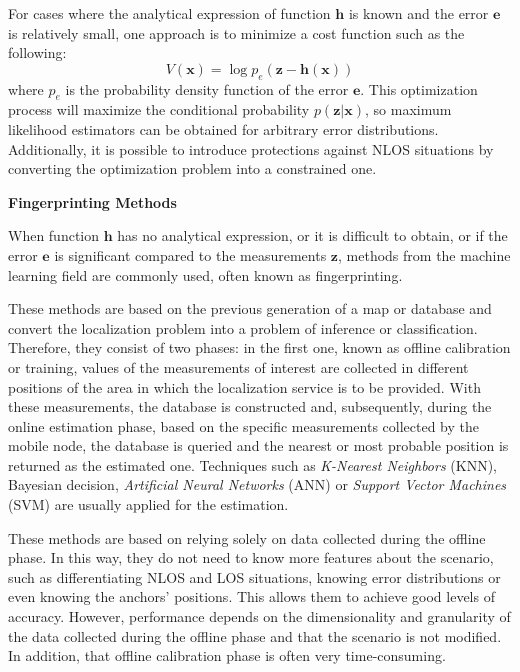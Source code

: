 \begin{description}
	For cases where the analytical expression of function $\boldsymbol{h}$ is known and the error $\boldsymbol{e}$ is relatively small, one approach is to minimize a cost function such as the following:
	\begin{equation}
	\label{eqn_costFunction}
		V(\boldsymbol{x})=\log p_e(\boldsymbol{z}-\boldsymbol{h}(\boldsymbol{x}))
	\end{equation}	
	where $p_e$ is the probability density function of the error $\boldsymbol{e}$. 	
	This optimization process will maximize the conditional probability $p(\boldsymbol{z}|\boldsymbol{x})$, so maximum likelihood estimators can be obtained for arbitrary error distributions.
	Additionally, it is possible to introduce protections against NLOS situations by converting the optimization problem into a constrained one.
	\item \textbf{Fingerprinting Methods}
	
	When function $\boldsymbol{h}$ has no analytical expression, or it is difficult to obtain, or if the error $\boldsymbol{e}$ is significant compared to the measurements $\boldsymbol{z}$, methods from the machine learning field are commonly used, often known as fingerprinting.
	
	These methods are based on the previous generation of a map or database and convert the localization problem into a problem of inference or classification.
	Therefore, they consist of two phases: in the first one, known as offline calibration or training, values of the measurements of interest are collected in different positions of the area in which the localization service is to be provided.
	With these measurements, the database is constructed and, subsequently, during the online estimation phase, based on the specific measurements collected by the mobile node, the database is queried and the nearest or most probable position is returned as the estimated one.
	Techniques such as \emph{K-Nearest Neighbors} (KNN), Bayesian decision, \emph{Artificial Neural Networks} (ANN) or \emph{Support Vector Machines} (SVM) are usually applied for the estimation.
	
	These methods are based on relying solely on data collected during the offline phase.
	In this way, they do not need to know more features about the scenario, such as differentiating NLOS and LOS situations, knowing error distributions or even knowing the anchors' positions.
	This allows them to achieve good levels of accuracy.
	However, performance depends on the dimensionality and granularity of the data collected during the offline phase and that the scenario is not modified.
	In addition, that offline calibration phase is often very time-consuming.
\end{description}	
